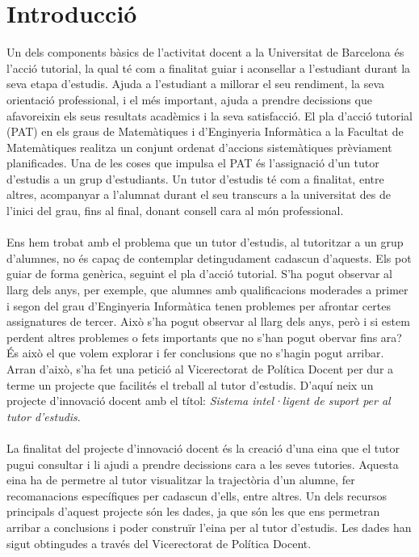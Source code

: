 \documentclass[12pt,a4paper,catalan]{article}
\begin{document}
\newpage 

\addto\captionsenglish{
  \renewcommand{\contentsname}%
    {Índex}%
}


{\hypersetup{linkcolor=black}
	\thispagestyle{empty}
	\tableofcontents
	\thispagestyle{empty}
}

\newpage

\setcounter{page}{1}


\section{Introducció}
Un dels components bàsics de l'activitat docent a la Universitat de Barcelona és l'acció tutorial, la qual té com a finalitat guiar i aconsellar a l'estudiant durant la seva etapa d'estudis. Ajuda a l'estudiant a millorar el seu rendiment, la seva orientació professional, i el més important, ajuda a prendre decissions que afavoreixin els seus resultats acadèmics i la seva satisfacció. El pla d'acció tutorial (PAT) en els graus de Matemàtiques i d'Enginyeria Informàtica a la Facultat de Matemàtiques realitza un conjunt ordenat d'accions sistemàtiques prèviament planificades. Una de les coses que impulsa el PAT és l'assignació d'un tutor d'estudis a un grup d'estudiants. Un tutor d'estudis té com a finalitat, entre altres, acompanyar a l'alumnat durant el seu transcurs a la universitat des de l'inici del grau, fins al final, donant consell cara al món professional.
\\
\\
Ens hem trobat amb el problema que un tutor d'estudis, al tutoritzar a un grup d'alumnes, no és capaç de contemplar detingudament cadascun d'aquests. Els pot guiar de forma genèrica, seguint el pla d'acció tutorial. S'ha pogut observar al llarg dels anys, per exemple, que alumnes amb qualificacions moderades a primer i segon del grau d'Enginyeria Informàtica tenen problemes per afrontar certes assignatures de tercer. Això s'ha pogut observar al llarg dels anys, però i si estem perdent altres problemes o fets importants que no s'han pogut obervar fins ara? És això el que volem explorar i fer conclusions que no s'hagin pogut arribar. Arran d'això, s'ha fet una petició al Vicerectorat de Política Docent per dur a terme un projecte que facilités el treball al tutor d'estudis. D'aquí neix un projecte d'innovació docent amb el títol: \textit{Sistema intel·ligent de suport per al tutor d'estudis}.
\\
\\
La finalitat del projecte d'innovació docent és la creació d'una eina que el tutor pugui consultar i li ajudi a prendre decissions cara a les seves tutories. Aquesta eina ha de permetre al tutor visualitzar la trajectòria d'un alumne, fer recomanacions específiques per cadascun d'ells, entre altres. Un dels recursos principals d'aquest projecte són les dades, ja que són les que ens permetran arribar a conclusions i poder construïr l'eina per al tutor d'estudis. Les dades han sigut obtingudes a través del Vicerectorat de Política Docent.
\end{document}
